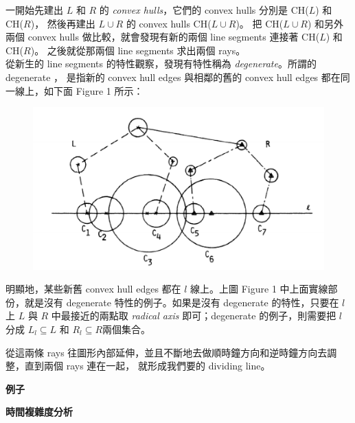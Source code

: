 \documentclass[12pt]{article}
\begin{document}
\begin{CJK}{UTF8}{bkai}
一開始先建出 $L$ 和 $R$ 的 {\it convex hulls}，它們的 convex hulls 分別是 CH($L$) 和 CH($R$)，
然後再建出 $L \cup R$ 的 convex hulls CH($L \cup R$)。
把 CH($L \cup R$) 和另外兩個 convex hulls 做比較，就會發現有新的兩個 line segments 連接著
 CH($L$) 和 CH($R$)。
之後就從那兩個 line segments 求出兩個 rays。\\

從新生的 line segments 的特性觀察，發現有特性稱為 {\it degenerate}。所謂的 degenerate ，
是指新的 convex hull edges 與相鄰的舊的 convex hull edges 都在同一線上，如下面 Figure 1 所示：\\


\begin{figure}
\includegraphics[scale=0.5]{figure5(i).eps}
\caption{}
\label{}
\end{figure}

明顯地，某些新舊 convex hull edges 都在 $l$ 線上。上圖 Figure 1 中上面實線部份，就是沒有 degenerate
 特性的例子。如果是沒有 degenerate 的特性，只要在 $l$ 上 $L$ 與 $R$ 中最接近的兩點取 {\it radical axis}
 即可；degenerate 的例子，則需要把 $l$ 分成 $L_l \subseteq L$ 和 $R_l \subseteq R$兩個集合。


從這兩條 rays 往圖形內部延伸，並且不斷地去做順時鐘方向和逆時鐘方向去調整，直到兩個 rays 連在一起，
就形成我們要的 dividing line。\\

\centerline{\bf 例子}

\centerline{\bf 時間複雜度分析}

\end{CJK}
\end{document}
